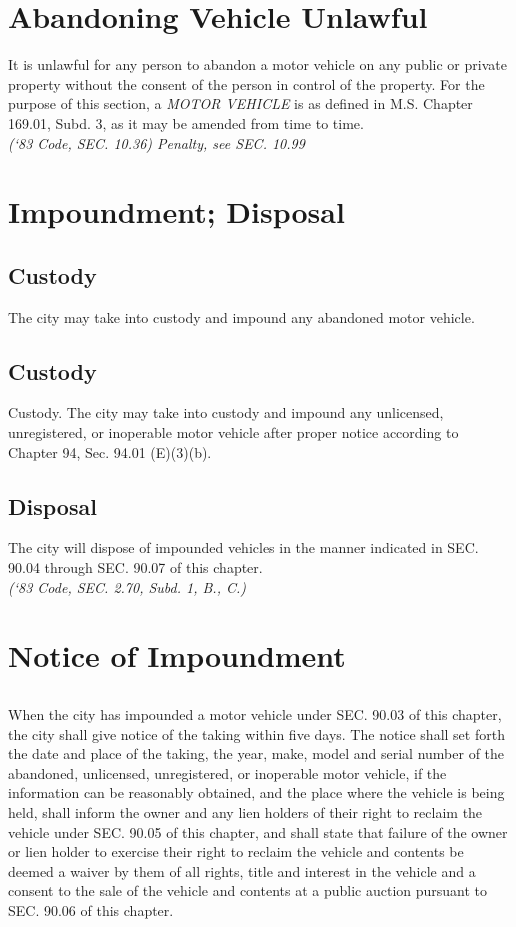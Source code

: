 \documentclass[code.tex]{subfiles}
\begin{document}
\section{Abandoning Vehicle Unlawful}
It is unlawful for any person to abandon a motor vehicle on any public or private property without the consent of the person in control of the property.  For the purpose of this section, a \emph{MOTOR VEHICLE} is as defined in M.S. Chapter 169.01, Subd. 3, as it may be amended from time to time.\\
\emph{(‘83 Code, SEC. 10.36)  Penalty, see SEC. 10.99}

\section{Impoundment; Disposal}
\subsection{Custody}
The city may take into custody and impound any abandoned motor vehicle.
\subsection{Custody}
Custody.  The city may take into custody and impound any unlicensed, unregistered, or inoperable motor vehicle after proper notice according to Chapter 94, Sec. 94.01 (E)(3)(b).
\subsection{Disposal}
The city will dispose of impounded vehicles in the manner indicated in SEC. 90.04 through SEC. 90.07 of this chapter.\\
\emph{(‘83 Code, SEC. 2.70, Subd. 1, B., C.)}

\section{Notice of Impoundment}
\subsection{}
When the city has impounded a motor vehicle under SEC. 90.03 of this chapter, the city shall give notice of the taking within five days.  The notice shall set forth the date and place of the taking, the year, make, model and serial number of the abandoned, unlicensed, unregistered, or inoperable motor vehicle, if the information can be reasonably obtained, and the place where the vehicle is being held, shall inform the owner and any lien holders of their right to reclaim the vehicle under SEC. 90.05 of this chapter, and shall state that failure of the owner or lien holder to exercise their right to reclaim the vehicle and contents be deemed a waiver by them of all rights, title and interest in the vehicle and a consent to the sale of the vehicle and contents at a public auction pursuant to SEC. 90.06 of this chapter.
\end{document}
